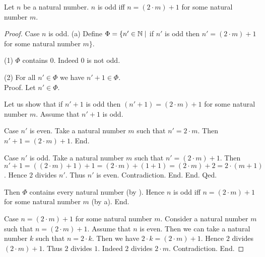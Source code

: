 \documentclass[10pt]{article}
\begin{document}
  \begin{forthel}
    \begin{proposition}
      Let $n$ be a natural number.
      $n$ is odd iff $n = (2 \cdot m) + 1$ for some natural number $m$.
    \end{proposition}
    \begin{proof}
      Case $n$ is odd.
        (a) Define $\Phi = \{ n' \in \mathbb{N} \mid$ if $n'$ is odd then $n' = (2 \cdot m) + 1$ for some natural number $m \}$.

        (1) $\Phi$ contains $0$.
        Indeed $0$ is not odd.

        (2) For all $n' \in \Phi$ we have $n' + 1 \in \Phi$. \\
        Proof.
          Let $n' \in \Phi$.

          Let us show that if $n' + 1$ is odd then $(n' + 1) = (2 \cdot m) + 1$ for some natural number $m$.
            Assume that $n' + 1$ is odd.

            Case $n'$ is even.
              Take a natural number $m$ such that $n' = 2 \cdot m$.
              Then $n' + 1 = (2 \cdot m) + 1$.
            End.

            Case $n'$ is odd.
              Take a natural number $m$ such that $n' = (2 \cdot m) + 1$.
              Then $n' + 1
                = ((2 \cdot m) + 1) + 1
                = (2 \cdot m) + (1 + 1)
                = (2 \cdot m) + 2
                = 2 \cdot (m + 1)$.
              Hence $2$ divides $n'$.
              Thus $n'$ is even.
              Contradiction.
            End.
          End.
        Qed.

        Then $\Phi$ contains every natural number (by ).
        Hence $n$ is odd iff $n = (2 \cdot m) + 1$ for some natural number $m$ (by a).
      End.

      Case $n = (2 \cdot m) + 1$ for some natural number $m$.
        Consider a natural number $m$ such that $n = (2 \cdot m) + 1$.
        Assume that $n$ is even.
        Then we can take a natural number $k$ such that $n = 2 \cdot k$.
        Then we have $2 \cdot k = (2 \cdot m) + 1$.
        Hence $2$ divides $(2 \cdot m) + 1$.
        Thus $2$ divides $1$.
        Indeed $2$ divides $2 \cdot m$.
        Contradiction.
      End.
    \end{proof}
  \end{forthel}
\end{document}
